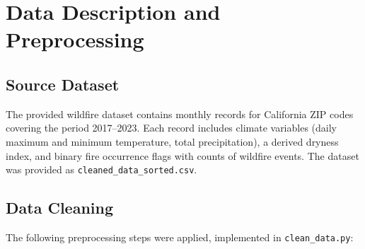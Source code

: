 \documentclass[11pt,a4paper]{article}
\begin{document}
\tableofcontents
\newpage

\section{Data Description and Preprocessing}
\label{sec:data}

\subsection{Source Dataset}
The provided wildfire dataset contains monthly records for California ZIP codes
covering the period 2017--2023. Each record includes climate variables
(daily maximum and minimum temperature, total precipitation), a derived dryness
index, and binary fire occurrence flags with counts of wildfire events.
The dataset was provided as \texttt{cleaned\_data\_sorted.csv}.

\subsection{Data Cleaning}
The following preprocessing steps were applied, implemented in \texttt{clean\_data.py}:
\end{document}
